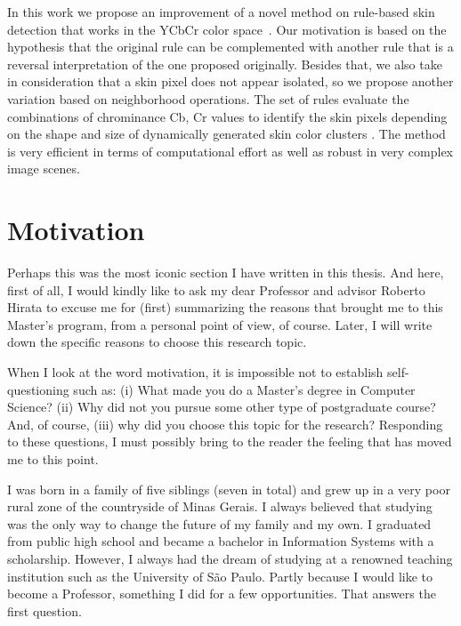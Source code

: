 In this work we propose an improvement of a novel method on rule-based skin detection that works in the YCbCr color space~\citep{brancati:17}. Our motivation is based on the hypothesis that the original rule can be complemented with another rule that is a reversal interpretation of the one proposed originally. Besides that, we also take in consideration that a skin pixel does not appear isolated, so we propose another variation based on neighborhood operations. The set of rules evaluate the combinations of chrominance Cb, Cr values to identify the skin pixels depending on the shape and size of dynamically generated skin color clusters \citep{brancati:17}. The method is very efficient in terms of computational effort as well as robust in very complex image scenes.


\section{Motivation}
\label{sec:motivation}

Perhaps this was the most iconic section I have written in this thesis. And here, first of all, I would kindly like to ask my dear Professor and advisor Roberto Hirata to excuse me for (first) summarizing the reasons that brought me to this Master's program, from a personal point of view, of course. Later, I will write down the specific reasons to choose this research topic.

When I look at the word motivation, it is impossible not to establish self-questioning such as: (i) What made you do a Master's degree in Computer Science? (ii) Why did not you pursue some other type of postgraduate course? And, of course, (iii) why did you choose this topic for the research? Responding to these questions, I must possibly bring to the reader the feeling that has moved me to this point.

I was born in a family of five siblings (seven in total) and grew up in a very poor rural zone of the countryside of Minas Gerais. I always believed that studying was the only way to change the future of my family and my own. I graduated from public high school and became a bachelor in Information Systems with a scholarship. However, I always had the dream of studying at a renowned teaching institution such as the University of São Paulo. Partly because I would like to become a Professor, something I did for a few opportunities. That answers the first question.


